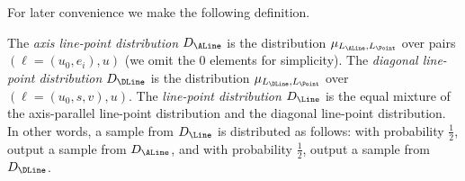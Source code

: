 For later convenience we make the following definition. 

\begin{definition}
        \label{def:line-point-dist}
 The \emph{axis line-point distribution} $D_{\ALine}$ is the
 distribution $\mu_{L_\ALine,L_\Point}$ over pairs $(\ell=(u_0,e_i),u)$
 (we omit the $0$ elements for simplicity). The \emph{diagonal
   line-point distribution} $D_{\DLine}$ is the distribution
 $\mu_{L_\DLine,L_\Point}$  over $(\ell=(u_0,s,v),u)$. The
 \emph{line-point distribution} $D_{\Line}$ is the equal mixture of the axis-parallel line-point distribution and the diagonal line-point distribution.
 In other words, a sample from $D_{\Line}$ is distributed as follows:
 with probability $\tfrac{1}{2}$, output a sample from $D_{\ALine}$,
 and with probability $\tfrac{1}{2}$, output a sample from $D_{\DLine}$.
\end{definition}
































